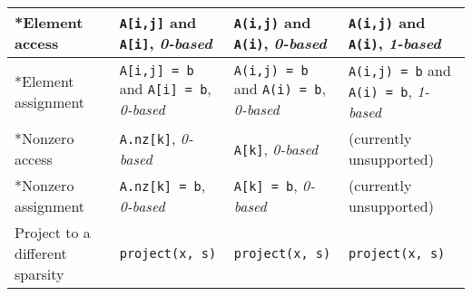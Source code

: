 \documentclass[a4paper,12pt]{book}
\begin{document}
\begin{center}
\begin{tabular}{| p{3.5cm} | p{3.5cm} | p{3.5cm} | p{3.5cm} | }
    *Element access
    & \verb|A[i,j]| and \verb|A[i]|, \linebreak \emph{0-based}
    & \verb|A(i,j)| and \verb|A(i)|, \linebreak \emph{0-based}
    & \verb|A(i,j)| and \verb|A(i)|, \linebreak \emph{1-based} \\ \hline
    *Element assignment
    & \verb|A[i,j] = b| and \verb|A[i] = b|, \linebreak \emph{0-based}
    & \verb|A(i,j) = b| and \verb|A(i) = b|, \linebreak \emph{0-based}
    & \verb|A(i,j) = b| and \verb|A(i) = b|, \linebreak \emph{1-based} \\ \hline
    *Nonzero access
    & \verb|A.nz[k]|, \emph{0-based}
    & \verb|A[k]|, \emph{0-based}
    & (currently unsupported) \\ \hline
    *Nonzero assignment
    & \verb|A.nz[k] = b|, \emph{0-based}
    & \verb|A[k] = b|, \emph{0-based}
    & (currently unsupported) \\ \hline
    Project to a different sparsity
    & \verb|project(x, s)| & \verb|project(x, s)| & \verb|project(x, s)| \\ \hline
  \end{tabular}
\end{center}

%
%
\end{document}
